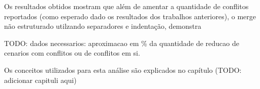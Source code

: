 Os resultados obtidos mostram que além de amentar a quantidade de conflitos reportados (como esperado dado os resultados dos trabalhos anteriores), 
o merge não estruturado utilzando separadores e indentação, demonstra 

TODO: dados necessarios: aproximacao em \% da quantidade de reducao de cenarios com conflitos ou de conflitos em si.

Os conceitos utilizados para esta análise são explicados no capítulo (TODO: adicionar capituli aqui)
